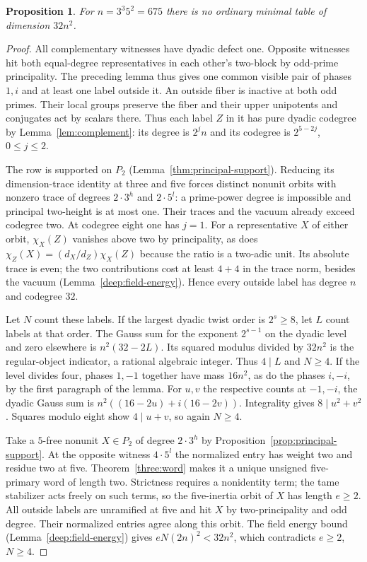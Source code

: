 \documentclass[11pt,a4paper]{article}
\numberwithin{equation}{section}
\newtheorem{proposition}[theorem]{Proposition}
\theoremstyle{remark}
\begin{document}
\begin{proposition}\label{short:ordinary-dyadic-quintic}
For $n=3^3 5^2=675$ there is no ordinary minimal table of dimension $32n^2$.
\end{proposition}
\begin{proof}
All complementary witnesses have dyadic defect one. Opposite witnesses
hit both equal-degree representatives in each other's two-block by
odd-prime principality. The preceding lemma thus gives one common
visible pair of phases $1,i$ and at least one label outside it.
An outside fiber is inactive at both odd primes. Their local groups
preserve the fiber and their upper unipotents and conjugates act by
scalars there. Thus each label $Z$ in it has pure dyadic codegree
by Lemma~\ref{lem:complement}: its degree is $2^jn$ and its codegree
is $2^{5-2j}$, $0\le j\le2$.

The row is supported on $P_2$ (Lemma~\ref{thm:principal-support}).
Reducing its dimension-trace identity at three and five forces
distinct nonunit orbits with nonzero trace of degrees $2\cdot3^h$
and $2\cdot5^l$: a prime-power degree is impossible and principal
two-height is at most one. Their traces and the vacuum already exceed
codegree two. At codegree eight one has $j=1$. For a representative
$X$ of either orbit, $\chi_X(Z)$ vanishes above two by principality,
as does $\chi_Z(X)=(d_X/d_Z)\chi_X(Z)$ because the ratio is a
two-adic unit. Its absolute trace is even; the two contributions
cost at least $4+4$ in the trace norm, besides the vacuum
(Lemma~\ref{deep:field-energy}). Hence every outside label has
degree $n$ and codegree $32$.

Let $N$ count these labels. If the largest dyadic twist order is
$2^s\ge8$, let $L$ count labels at that order. The Gauss sum for
the exponent $2^{s-1}$ on the dyadic level and zero elsewhere is
$n^2(32-2L)$. Its squared modulus divided by $32n^2$ is the
regular-object indicator, a rational algebraic integer. Thus
$4\mid L$ and $N\ge4$. If the level divides four, phases
$1,-1$ together have mass $16n^2$, as do the phases $i,-i$, by
the first paragraph of the lemma. For $u,v$ the respective counts
at $-1,-i$, the dyadic Gauss sum is
$n^2((16-2u)+i(16-2v))$. Integrality gives $8\mid u^2+v^2$.
Squares modulo eight show $4\mid u+v$, so again $N\ge4$.

Take a $5$-free nonunit $X\in P_2$ of degree $2\cdot3^h$ by
Proposition~\ref{prop:principal-support}. At the opposite witness
$4\cdot5^l$ the normalized entry has weight two and residue two
at five. Theorem~\ref{three:word} makes it a unique unsigned
five-primary word of length two. Strictness requires a nonidentity
term; the tame stabilizer acts freely on such terms, so the
five-inertia orbit of $X$ has length $e\ge2$. All outside labels
are unramified at five and hit $X$ by two-principality and odd
degree. Their normalized entries agree along this orbit. The field
energy bound (Lemma~\ref{deep:field-energy}) gives
$eN(2n)^2<32n^2$, which contradicts $e\ge2$, $N\ge4$.
\end{proof}
\end{document}
